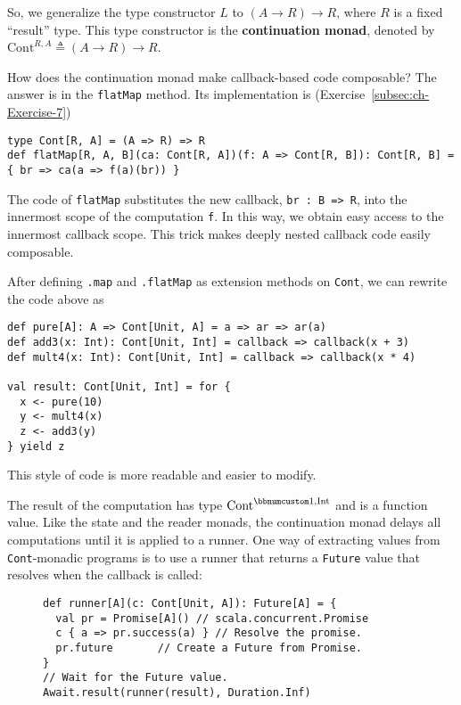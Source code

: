 So, we generalize the type constructor $L$ to $\left(A\rightarrow R\right)\rightarrow R$,
where $R$ is a fixed \textsf{``}result\textsf{''} type. This type constructor is
the \textbf{continuation monad}, denoted by $\text{Cont}^{R,A}\triangleq\left(A\rightarrow R\right)\rightarrow R$.

How does the continuation monad make callback-based code composable?
The answer is in the \lstinline!flatMap! method. Its implementation
is (Exercise~\ref{subsec:ch-Exercise-7})
\begin{lstlisting}
type Cont[R, A] = (A => R) => R
def flatMap[R, A, B](ca: Cont[R, A])(f: A => Cont[R, B]): Cont[R, B] = { br => ca(a => f(a)(br)) }
\end{lstlisting}
The code of \lstinline!flatMap! substitutes the new callback, \lstinline!br : B => R!,
into the innermost scope of the computation \lstinline!f!. In this
way, we obtain easy access to the innermost callback scope. This trick
makes deeply nested callback code easily composable.

After defining \lstinline!.map! and \lstinline!.flatMap! as extension
methods on \lstinline!Cont!, we can rewrite the code above as
\begin{lstlisting}
def pure[A]: A => Cont[Unit, A] = a => ar => ar(a)
def add3(x: Int): Cont[Unit, Int] = callback => callback(x + 3)
def mult4(x: Int): Cont[Unit, Int] = callback => callback(x * 4)

val result: Cont[Unit, Int] = for {
  x <- pure(10)
  y <- mult4(x)
  z <- add3(y)
} yield z
\end{lstlisting}
This style of code is more readable and easier to modify.

The result of the computation has type $\text{Cont}^{\bbnum 1,\text{Int}}$
and is a function value. Like the state and the reader monads, the
continuation monad delays all computations until it is applied to
a runner. One way of extracting values from
\lstinline!Cont!-monadic programs is to use a runner that returns
a \lstinline!Future! value that resolves when the callback is called:

\begin{wrapfigure}{l}{0.515\columnwidth}%
\vspace{-0.8\baselineskip}
\begin{lstlisting}
def runner[A](c: Cont[Unit, A]): Future[A] = {
  val pr = Promise[A]() // scala.concurrent.Promise
  c { a => pr.success(a) } // Resolve the promise.
  pr.future       // Create a Future from Promise.
}
// Wait for the Future value.
Await.result(runner(result), Duration.Inf)
\end{lstlisting}

\vspace{-1\baselineskip}
\end{wrapfigure}%

